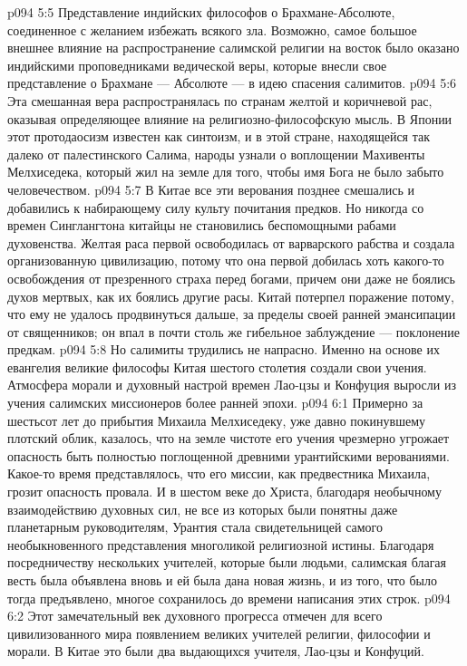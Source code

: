\vs p094 5:5 \bibnobreakspace Представление индийских философов о Брахмане\hyp{}Абсолюте, соединенное с желанием избежать всякого зла. Возможно, самое большое внешнее влияние на распространение салимской религии на восток было оказано индийскими проповедниками ведической веры, которые внесли свое представление о Брахмане --- Абсолюте --- в идею спасения салимитов.
\vs p094 5:6 \pc Эта смешанная вера распространялась по странам желтой и коричневой рас, оказывая определяющее влияние на религиозно\hyp{}философскую мысль. В Японии этот протодаосизм известен как синтоизм, и в этой стране, находящейся так далеко от палестинского Салима, народы узнали о воплощении Махивенты Мелхиседека, который жил на земле для того, чтобы имя Бога не было забыто человечеством.
\vs p094 5:7 В Китае все эти верования позднее смешались и добавились к набирающему силу культу почитания предков. Но никогда со времен Синглангтона китайцы не становились беспомощными рабами духовенства. Желтая раса первой освободилась от варварского рабства и создала организованную цивилизацию, потому что она первой добилась хоть какого\hyp{}то освобождения от презренного страха перед богами, причем они даже не боялись духов мертвых, как их боялись другие расы. Китай потерпел поражение потому, что ему не удалось продвинуться дальше, за пределы своей ранней эмансипации от священников; он впал в почти столь же гибельное заблуждение --- поклонение предкам.
\vs p094 5:8 \pc Но салимиты трудились не напрасно. Именно на основе их евангелия великие философы Китая шестого столетия создали свои учения. Атмосфера морали и духовный настрой времен Лао\hyp{}цзы и Конфуция выросли из учения салимских миссионеров более ранней эпохи.
\vs p094 6:1 Примерно за шестьсот лет до прибытия Михаила Мелхиседеку, уже давно покинувшему плотский облик, казалось, что на земле чистоте его учения чрезмерно угрожает опасность быть полностью поглощенной древними урантийскими верованиями. Какое\hyp{}то время представлялось, что его миссии, как предвестника Михаила, грозит опасность провала. И в шестом веке до Христа, благодаря необычному взаимодействию духовных сил, не все из которых были понятны даже планетарным руководителям, Урантия стала свидетельницей самого необыкновенного представления многоликой религиозной истины. Благодаря посредничеству нескольких учителей, которые были людьми, салимская благая весть была объявлена вновь и ей была дана новая жизнь, и из того, что было тогда предъявлено, многое сохранилось до времени написания этих строк.
\vs p094 6:2 Этот замечательный век духовного прогресса отмечен для всего цивилизованного мира появлением великих учителей религии, философии и морали. В Китае это были два выдающихся учителя, Лао\hyp{}цзы и Конфуций.
